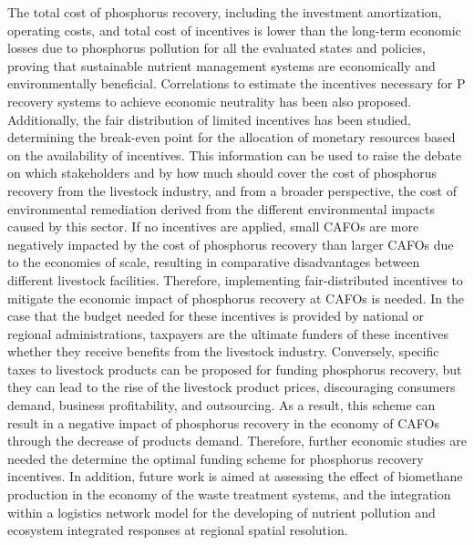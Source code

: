 \begin{refsection}[referencesCh5]
The total cost of phosphorus recovery, including the investment amortization, operating costs, and total cost of incentives is lower than the long-term economic losses due to phosphorus pollution for all the evaluated states and policies, proving that sustainable nutrient management systems are economically and environmentally beneficial. Correlations to estimate the incentives necessary for P recovery systems to achieve economic neutrality has been also proposed. Additionally, the fair distribution of limited incentives has been studied, determining the break-even point for the allocation of monetary resources based on the availability of incentives. This information can be used to raise the debate on which stakeholders and by how much should cover the cost of phosphorus recovery from the livestock industry, and from a broader perspective, the cost of environmental remediation derived from the different environmental impacts caused by this sector. If no incentives are applied, small CAFOs are more negatively impacted by the cost of phosphorus recovery than larger CAFOs due to the economies of scale, resulting in comparative disadvantages between different livestock facilities. Therefore, implementing fair-distributed incentives to mitigate the economic impact of phosphorus recovery at CAFOs is needed. In the case that the budget needed for these incentives is provided by national or regional administrations, taxpayers are the ultimate funders of these incentives whether they
receive benefits from the livestock industry. Conversely, specific taxes to livestock products can be proposed for funding phosphorus recovery, but they can lead to the rise of the livestock product prices, discouraging consumers demand, business profitability, and outsourcing. As a result, this scheme can result in a negative impact of phosphorus recovery in the economy of CAFOs through the decrease of products demand. Therefore, further economic studies are needed the determine the optimal funding scheme for phosphorus recovery incentives. In addition,
future work is aimed at assessing the effect of biomethane production in the economy of the waste treatment systems, and the integration within a logistics network model for the developing of nutrient pollution and ecosystem integrated responses at regional spatial resolution.


\end{refsection}
